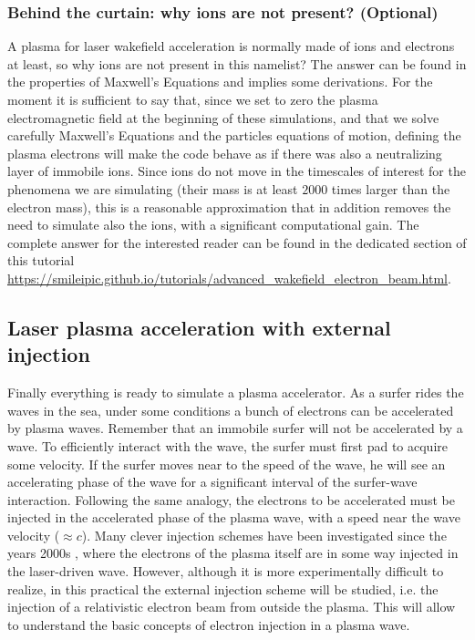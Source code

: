 \documentclass[a4paper,12pt]{extarticle}
\begin{document}
\subsubsection*{Behind the curtain: why ions are not present? (Optional)} A plasma for laser wakefield acceleration is normally made of ions and electrons at least, so why ions are not present in this namelist? The answer can be found in the properties of Maxwell's Equations and implies some derivations.  For the moment it is sufficient to say that, since we set to zero the plasma electromagnetic field at the beginning of these simulations, and that we solve carefully Maxwell's Equations and the particles equations of motion, defining the plasma electrons will make the code behave as if there was also a neutralizing layer of immobile ions. Since ions do not move in the timescales of interest for the phenomena we are simulating (their mass is at  least $2000$ times larger than the electron mass), this is a reasonable approximation that in addition removes the need to simulate also the ions, with a significant computational gain. The complete answer for the interested reader can be found in the dedicated section of this tutorial \url{https://smileipic.github.io/tutorials/advanced_wakefield_electron_beam.html}.

\subsection{Laser plasma acceleration with external injection}
Finally everything is ready to simulate a plasma accelerator. As a surfer rides the waves in the sea,  under some conditions a bunch of electrons can be accelerated by plasma waves. Remember that an immobile surfer will not be accelerated by a wave. To efficiently interact with the wave, the surfer must first pad to acquire some velocity. If the surfer moves near to the speed of the wave, he will see an accelerating phase of the wave for a significant interval of the surfer-wave interaction.
Following the same analogy,  the electrons to be accelerated must be injected in the accelerated phase of the plasma wave, with a speed near the wave velocity  ($\approx c$). Many clever injection schemes have been investigated since the years 2000s \cite{Malka2002,Esarey2009,Malka2012,FaureCAS}, where the electrons of the plasma itself are in some way injected in the laser-driven wave. However, although it is more experimentally difficult to realize, in this practical the external injection scheme will be studied, i.e. the injection of a relativistic electron beam from outside the plasma. This will allow to understand the basic concepts of electron injection in a plasma wave. \\
\end{document}

